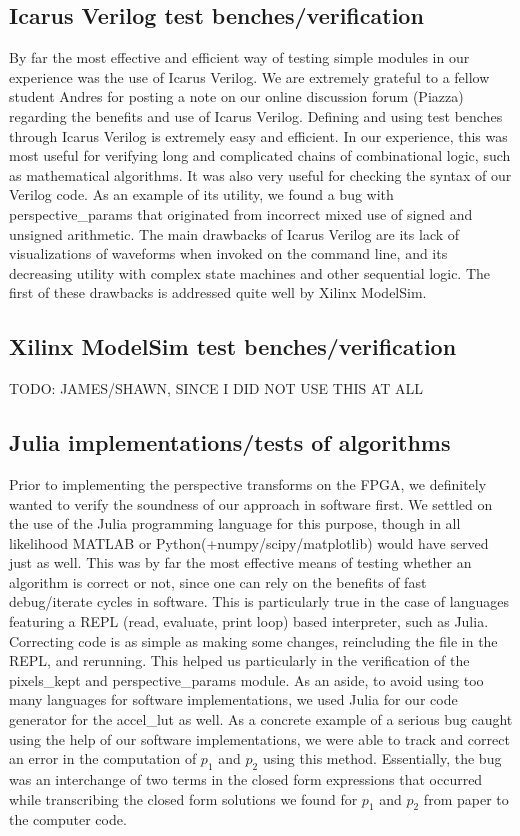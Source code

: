 \documentclass{article}
\begin{document}
\subsection{Icarus Verilog test benches/verification}
By far the most effective and efficient way of testing simple modules in our experience was the use of Icarus Verilog.
We are extremely grateful to a fellow student Andres for posting a note on our online discussion forum (Piazza) regarding the benefits and use of Icarus Verilog.
Defining and using test benches through Icarus Verilog is extremely easy and efficient.
In our experience, this was most useful for verifying long and complicated chains of combinational logic, such as mathematical algorithms.
It was also very useful for checking the syntax of our Verilog code.
As an example of its utility, we found a bug with perspective\_params that originated from incorrect mixed use of signed and unsigned arithmetic.
The main drawbacks of Icarus Verilog are its lack of visualizations of waveforms when invoked on the command line,
and its decreasing utility with complex state machines and other sequential logic.
The first of these drawbacks is addressed quite well by Xilinx ModelSim.

\subsection{Xilinx ModelSim test benches/verification}
TODO: JAMES/SHAWN, SINCE I DID NOT USE THIS AT ALL

\subsection{Julia implementations/tests of algorithms}
Prior to implementing the perspective transforms on the FPGA,
we definitely wanted to verify the soundness of our approach in software first.
We settled on the use of the Julia programming language for this purpose,
though in all likelihood MATLAB or Python(+numpy/scipy/matplotlib) would have served just as well.
This was by far the most effective means of testing whether an algorithm is correct or not,
since one can rely on the benefits of fast debug/iterate cycles in software.
This is particularly true in the case of languages featuring a REPL (read, evaluate, print loop) based interpreter, such as Julia.
Correcting code is as simple as making some changes, reincluding the file in the REPL, and rerunning.
This helped us particularly in the verification of the pixels\_kept and perspective\_params module.
As an aside, to avoid using too many languages for software implementations,
we used Julia for our code generator for the accel\_lut as well.
As a concrete example of a serious bug caught using the help of our software implementations,
we were able to track and correct an error in the computation of $p_1$ and $p_2$ using this method.
Essentially, the bug was an interchange of two terms in the closed form expressions that occurred
while transcribing the closed form solutions we found for $p_1$ and $p_2$ from paper to the computer code.
\end{document}
